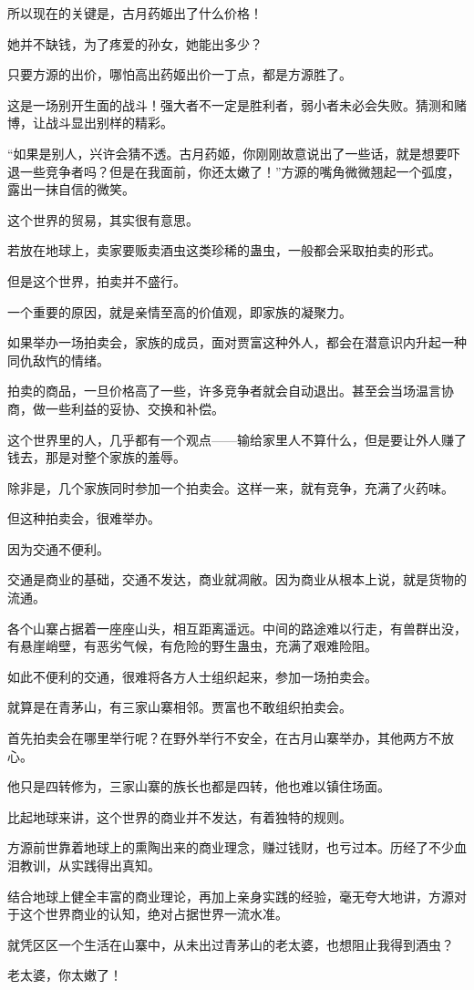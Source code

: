 \begin{this_body}
所以现在的关键是，古月药姬出了什么价格！

她并不缺钱，为了疼爱的孙女，她能出多少？

只要方源的出价，哪怕高出药姬出价一丁点，都是方源胜了。

这是一场别开生面的战斗！强大者不一定是胜利者，弱小者未必会失败。猜测和赌博，让战斗显出别样的精彩。

“如果是别人，兴许会猜不透。古月药姬，你刚刚故意说出了一些话，就是想要吓退一些竞争者吗？但是在我面前，你还太嫩了！”方源的嘴角微微翘起一个弧度，露出一抹自信的微笑。

这个世界的贸易，其实很有意思。

若放在地球上，卖家要贩卖酒虫这类珍稀的蛊虫，一般都会采取拍卖的形式。

但是这个世界，拍卖并不盛行。

一个重要的原因，就是亲情至高的价值观，即家族的凝聚力。

如果举办一场拍卖会，家族的成员，面对贾富这种外人，都会在潜意识内升起一种同仇敌忾的情绪。

拍卖的商品，一旦价格高了一些，许多竞争者就会自动退出。甚至会当场温言协商，做一些利益的妥协、交换和补偿。

这个世界里的人，几乎都有一个观点——输给家里人不算什么，但是要让外人赚了钱去，那是对整个家族的羞辱。

除非是，几个家族同时参加一个拍卖会。这样一来，就有竞争，充满了火药味。

但这种拍卖会，很难举办。

因为交通不便利。

交通是商业的基础，交通不发达，商业就凋敝。因为商业从根本上说，就是货物的流通。

各个山寨占据着一座座山头，相互距离遥远。中间的路途难以行走，有兽群出没，有悬崖峭壁，有恶劣气候，有危险的野生蛊虫，充满了艰难险阻。

如此不便利的交通，很难将各方人士组织起来，参加一场拍卖会。

就算是在青茅山，有三家山寨相邻。贾富也不敢组织拍卖会。

首先拍卖会在哪里举行呢？在野外举行不安全，在古月山寨举办，其他两方不放心。

他只是四转修为，三家山寨的族长也都是四转，他也难以镇住场面。

比起地球来讲，这个世界的商业并不发达，有着独特的规则。

方源前世靠着地球上的熏陶出来的商业理念，赚过钱财，也亏过本。历经了不少血泪教训，从实践得出真知。

结合地球上健全丰富的商业理论，再加上亲身实践的经验，毫无夸大地讲，方源对于这个世界商业的认知，绝对占据世界一流水准。

就凭区区一个生活在山寨中，从未出过青茅山的老太婆，也想阻止我得到酒虫？

老太婆，你太嫩了！

\end{this_body}

